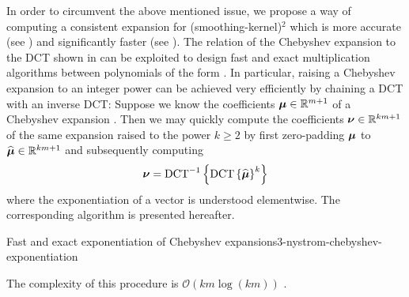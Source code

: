 In order to circumvent the above mentioned issue, we propose a way of computing
a consistent expansion for (\gls{smoothing-kernel})$^2$ which is more accurate
(see ) and significantly faster
(see ).
The relation of the Chebyshev expansion to the \gls{DCT} shown in 
can be exploited to design fast and exact multiplication algorithms between polynomials
of the form  \cite[proposition~3.1]{baszenski1997cosine}.
In particular, raising a Chebyshev expansion to an integer power can be achieved
very efficiently by chaining a \gls{DCT} with an inverse \gls{DCT}:
Suppose we know the coefficients $\boldsymbol{\mu} \in \mathbb{R}^{m+1}$
of a Chebyshev expansion .
Then we may quickly compute the coefficients $\boldsymbol{\nu} \in \mathbb{R}^{km+1}$
of the same expansion raised to the power $k \geq 2$ by first zero-padding
$\boldsymbol{\mu}$ to $\widehat{\boldsymbol{\mu}} \in \mathbb{R}^{km+1}$
and subsequently computing
\begin{equation}
    \boldsymbol{\nu} = \operatorname{DCT}^{-1}\left\{ \operatorname{DCT}\left\{\widehat{\boldsymbol{\mu}}\right\}^{k} \right\}
    \label{equ:3-nystrom-chebyshev-potentiate-coefficients}
\end{equation}
where the exponentiation of a vector is understood elementwise.
The corresponding algorithm is presented hereafter.
\begin{algo}{Fast and exact exponentiation of Chebyshev expansions}{3-nystrom-chebyshev-exponentiation}
    
\end{algo}
The complexity of this procedure is $\mathcal{O}(km \log(km))$ \cite{makhoul1980fct}.\\
\begin{table}[ht]
    \caption{Comparison of the runtime in milliseconds of the two approaches with which the coefficients
    of the Chebyshev expansion of a function. We average over 7 runs of the
    algorithms and repeat these runs 100 times to form the mean and standard
    deviation which are given in the below table. We refer to the interpolation
    of (\gls{smoothing-kernel})$^{2}$ with \cite[algorithm~1]{lin2017randomized} as \enquote{quadrature},
    to the interpolation of (\gls{smoothing-kernel})$^{2}$ with  as \enquote{DCT},
    and finally to the fast squaring algorithm  as \enquote{squaring}.
    For each algorithm, we interpolate a Gaussian \gls{smoothing-kernel} with \gls{smoothing-parameter} $=0.05$,
    at \gls{num-evaluation-points} $=1000$ points, for various values of \gls{chebyshev-degree}.}
    \label{tab:3-nystrom-timing-squared-interpolation}
    
\end{table}

